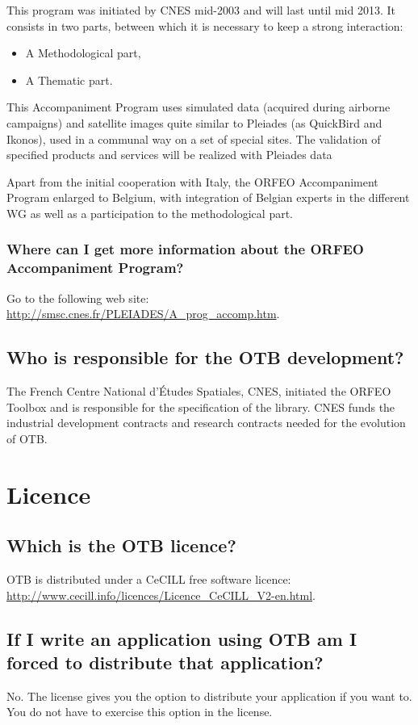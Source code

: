 This program was initiated by CNES mid-2003 and will last until mid 2013.
It consists in two parts, between which it is necessary to keep a strong interaction:
\begin{itemize}
\item A Methodological part,
\item A Thematic part.
\end{itemize}

This Accompaniment Program uses simulated data (acquired during airborne campaigns) and satellite images quite similar to Pleiades (as QuickBird and Ikonos), used in a communal way on a set of special sites. The validation of specified products and services will be realized with Pleiades data

Apart from the initial cooperation with Italy, the ORFEO Accompaniment
Program enlarged to Belgium, with integration of Belgian experts in
the different WG as well as a participation to the methodological
part.

\subsubsection{Where can I get more information about the ORFEO
  Accompaniment Program?}
Go to the following web site:
\url{http://smsc.cnes.fr/PLEIADES/A_prog_accomp.htm}.

\subsection{Who is responsible for the OTB development?}
The French Centre National d'\'Etudes Spatiales, CNES, initiated the ORFEO
Toolbox and is responsible for the specification of the library. CNES
funds the industrial development contracts and research contracts
needed for the evolution of OTB.

\section{Licence}
\subsection{Which is the OTB licence?}
OTB is distributed under a CeCILL free software licence:\\
\url{http://www.cecill.info/licences/Licence_CeCILL_V2-en.html}.


\subsection{If I write an application using OTB am I forced to distribute that application?}
No. The license gives you the option to distribute your application if
you want to. You do not have to exercise this option in the license.

